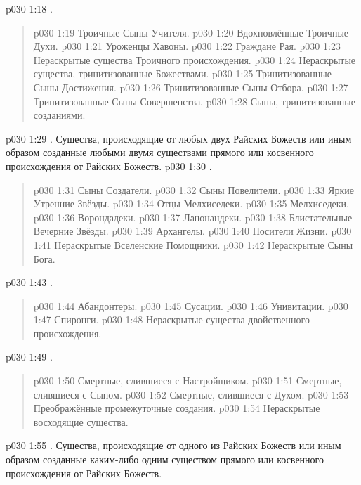 \vs p030 1:18 .
\begin{quote}
\vs p030 1:19 Троичные Сыны Учителя.
\vs p030 1:20 Вдохновлённые Троичные Духи.
\vs p030 1:21 Уроженцы Хавоны.
\vs p030 1:22 Граждане Рая.
\vs p030 1:23 Нераскрытые существа Троичного происхождения.
\vs p030 1:24 Нераскрытые существа, тринитизованные Божествами.
\vs p030 1:25 Тринитизованные Сыны Достижения.
\vs p030 1:26 Тринитизованные Сыны Отбора.
\vs p030 1:27 Тринитизованные Сыны Совершенства.
\vs p030 1:28 Сыны, тринитизованные созданиями.
\end{quote}
\vs p030 1:29 . Существа, происходящие от любых двух Райских Божеств или иным образом созданные любыми двумя существами прямого или косвенного происхождения от Райских Божеств.
\vs p030 1:30 .
\begin{quote}
\vs p030 1:31 Сыны Создатели.
\vs p030 1:32 Сыны Повелители.
\vs p030 1:33 Яркие Утренние Звёзды.
\vs p030 1:34 Отцы Мелхиседеки.
\vs p030 1:35 Мелхиседеки.
\vs p030 1:36 Ворондадеки.
\vs p030 1:37 Ланонандеки.
\vs p030 1:38 Блистательные Вечерние Звёзды.
\vs p030 1:39 Архангелы.
\vs p030 1:40 Носители Жизни.
\vs p030 1:41 Нераскрытые Вселенские Помощники.
\vs p030 1:42 Нераскрытые Сыны Бога.
\end{quote}
\vs p030 1:43 .
\begin{quote}
\vs p030 1:44 Абандонтеры.
\vs p030 1:45 Сусации.
\vs p030 1:46 Унивитации.
\vs p030 1:47 Спиронги.
\vs p030 1:48 Нераскрытые существа двойственного происхождения.
\end{quote}
\vs p030 1:49 .
\begin{quote}
\vs p030 1:50 Смертные, слившиеся с Настройщиком.
\vs p030 1:51 Смертные, слившиеся с Сыном.
\vs p030 1:52 Смертные, слившиеся с Духом.
\vs p030 1:53 Преображённые промежуточные создания.
\vs p030 1:54 Нераскрытые восходящие существа.
\end{quote}
\vs p030 1:55 . Существа, происходящие от одного из Райских Божеств или иным образом созданные каким\hyp{}либо одним существом прямого или косвенного происхождения от Райских Божеств.
